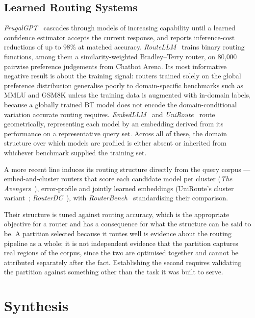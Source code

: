 \subsection*{Learned Routing Systems}

\textit{FrugalGPT}~\parencite{chen2023frugalgpt} cascades through
models of increasing capability until a learned confidence estimator
accepts the current response, and reports inference-cost reductions
of up to 98\% at matched accuracy.
\textit{RouteLLM}~\parencite{ong2024routellm} trains binary routing
functions, among them a similarity-weighted Bradley--Terry router, on
80{,}000 pairwise preference judgements from Chatbot Arena. Its most
informative negative result is about the training signal: routers
trained solely on the global preference distribution generalise
poorly to domain-specific benchmarks such as MMLU and GSM8K unless
the training data is augmented with in-domain labels, because a
globally trained BT model does not encode the domain-conditional
variation accurate routing requires.
\textit{EmbedLLM}~\parencite{zhuang2024embedllm} and
\textit{UniRoute}~\parencite{jitkrittum2025uniroute} route
geometrically, representing each model by an embedding derived from
its performance on a representative query set. Across all of these,
the domain structure over which models are profiled is either absent
or inherited from whichever benchmark supplied the training set.

A more recent line induces its routing structure directly from the
query corpus --- embed-and-cluster routers that score each candidate
model per cluster
(\textit{The Avengers}~\parencite{zhang2025avengers,
zhang2025avengerspro}), error-profile and jointly learned embeddings
(UniRoute's cluster variant~\parencite{jitkrittum2025uniroute};
\textit{RouterDC}~\parencite{chen2024routerdc}), with
\textit{RouterBench}~\parencite{hu2024routerbench} standardising
their comparison.

Their structure is tuned against routing accuracy, which is the
appropriate objective for a router and has a consequence for what the
structure can be said to be. A partition selected because it routes
well is evidence about the routing pipeline as a whole; it is not
independent evidence that the partition captures real regions of the
corpus, since the two are optimised together and cannot be
attributed separately after the fact. Establishing the second
requires validating the partition against something other than the
task it was built to serve.


\section{Synthesis}\label{sec:synthesis}

